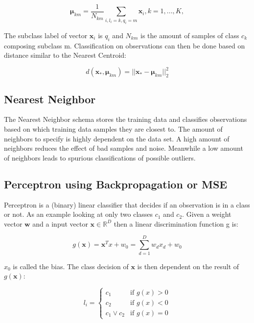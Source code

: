 \begin{equation}
    \mathbf{\mu}_{km} = \frac{1}{N_{km}} \sum_{i,l_i=k, q_i=m}{\mathbf{x}_i}, k=1,...,K,
\end{equation}

The subclass label of vector $\mathbf{x}_i$ is $q_i$ and $N_{km}$ is the amount of samples of class $c_k$ composing subclass m. Classification on observations can then be done based on distance similar to the Nearest Centroid: 

\begin{equation}
    d(\mathbf{x}_*, \mathbf{\mu}_{km}) = ||\mathbf{x}_*-\mathbf{\mu}_{km}||^2_2
\end{equation}

\subsection{Nearest Neighbor}
The Nearest Neighbor schema stores the training data and classifies observations based on which training data samples they are closest to. The amount of neighbors to specify is highly dependent on the data set. A high amount of neighbors reduces the effect of bad samples and noise\cite{nearest-neighbor}. Meanwhile a low amount of neighbors leads to spurious classifications of possible outliers. 

\subsection{Perceptron using Backpropagation or MSE}
Perceptron is a (binary) linear classifier that decides if an observation is in a class or not. As an example looking at only two classes $c_1$ and $c_2$. Given a weight vector $\mathbf{w}$ and a input vector $\mathbf{x}\in\mathbb{R}^D$ then a linear discrimination function g is: 

\begin{equation}
    g(\mathbf{x})=\mathbf{x}^Tx + w_0 = \sum_{d=1}^D{w_dx_d+w_0}
\end{equation}

$x_0$ is called the bias. The class decision of $\mathbf{x}$ is then dependent on the result of $g(\mathbf{x})$: 

\begin{equation}
    l_i=
    \begin{cases}
        c_1& \text{if $g(x)>0$} \\
        c_2& \text{if $g(x)<0$}  \\
        c_1 \lor c_2& \text{if $g(x)=0$}
    \end{cases}
\end{equation}


